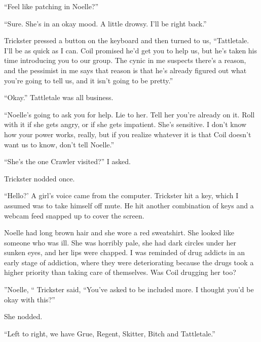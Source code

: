 ``Feel like patching in Noelle?''



``Sure.  She's in an okay mood.  A little drowsy.  I'll be right back.''



Trickster pressed a button on the keyboard and then turned to us, ``Tattletale.  I'll be as quick as I can.  Coil promised he'd get you to help us, but he's taken his time introducing you to our group.  The cynic in me suspects there's a reason, and the pessimist in me says that reason is that he's already figured out what you're going to tell us, and it isn't going to be pretty.''



``Okay.''  Tattletale was all business.



``Noelle's going to ask you for help.  Lie to her.  Tell her you're already on it.  Roll with it if she gets angry, or if she gets impatient.  She's sensitive.  I don't know how your power works, really, but if you realize whatever it is that Coil doesn't want us to know, don't tell Noelle.''



``She's the one Crawler visited?'' I asked.



Trickster nodded once.



``Hello?'  A girl's voice came from the computer.  Trickster hit a key, which I assumed was to take himself off mute.  He hit another combination of keys and a webcam feed snapped up to cover the screen.



Noelle had long brown hair and she wore a red sweatshirt.  She looked like someone who was ill.  She was horribly pale, she had dark circles under her sunken eyes, and her lips were chapped.  I was reminded of drug addicts in an early stage of addiction, where they were deteriorating because the drugs took a higher priority than taking care of themselves.  Was Coil drugging her too?



''Noelle, `` Trickster said, ``You've asked to be included more.  I thought you'd be okay with this?''



She nodded.



``Left to right, we have Grue, Regent, Skitter, Bitch and Tattletale.''



